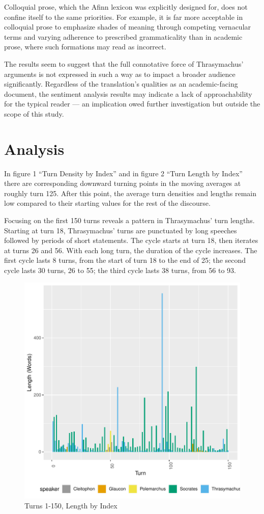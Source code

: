 \documentclass[noraggedright]{turabian-researchpaper}
\begin{document}
Colloquial prose, which the Afinn lexicon was explicitly designed for, does not confine itself to the same priorities. For example, it is far more acceptable in colloquial prose to emphasize shades of meaning through competing vernacular terms and varying adherence to prescribed grammaticality than in academic prose, where such formations may read as incorrect. 

The results seem to suggest that the full connotative force of Thrasymachus' arguments is not expressed in such a way as to impact a broader audience significantly. Regardless of the translation's qualities as an academic-facing document, the sentiment analysis results may indicate a lack of approachability for the typical reader — an implication owed further investigation but outside the scope of this study.

\section{Analysis}
In figure 1 ``Turn Density by Index'' and in figure 2 ``Turn Length by Index'' there are corresponding downward turning points in the moving averages at roughly turn 125. After this point, the average turn densities and lengths remain low compared to their starting values for the rest of the discourse.

Focusing on the first 150 turns reveals a pattern in Thrasymachus' turn lengths. Starting at turn 18, Thrasymachus' turns are punctuated by long speeches followed by periods of short statements. The cycle starts at turn 18, then iterates at turns 26 and 56. With each long turn, the duration of the cycle increases. The first cycle lasts 8 turns, from the start of turn 18 to the end of 25; the second cycle lasts 30 turns, 26 to 55; the third cycle lasts 38 turns, from 56 to 93.

\begin{figure}[htbp]
\includegraphics{GreatFlood-Fig: P1 Lengths}
\caption{Turns 1-150, Length by Index}
\label{Fig:P1Turns}
\end{figure}
\end{document}
